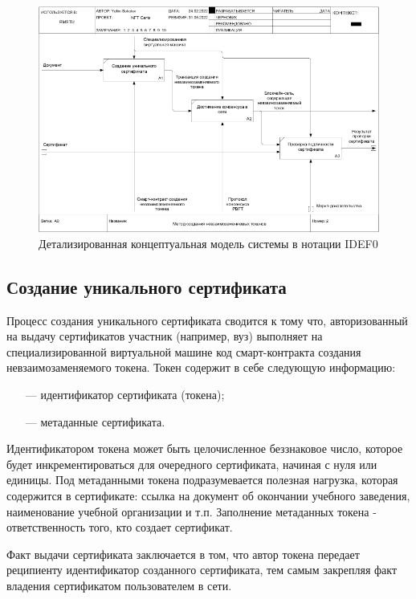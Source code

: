 \begin{figure}[!ht]
	\centering
	\includegraphics[width=\textwidth]{img/idef0_detail.png}
	\caption{Детализированная концептуальная модель системы в нотации IDEF0}
	\label{fig:a3}
\end{figure}

\subsection{Создание уникального сертификата}

Процесс создания уникального сертификата сводится к тому что, авторизованный на выдачу сертификатов участник (например, вуз) выполняет на специализированной виртуальной машине код смарт-контракта создания невзаимозаменяемого токена. Токен содержит в себе следующую информацию:
\begin{itemize}[leftmargin=1.6\parindent]
	\item[---] идентификатор сертификата (токена);
	\item[---] метаданные сертификата.
\end{itemize}
Идентификатором токена может быть целочисленное беззнаковое число, которое будет инкрементироваться для очередного сертификата, начиная с нуля или единицы. Под метаданными токена подразумевается полезная нагрузка, которая содержится в сертификате: ссылка на документ об окончании учебного заведения, наименование учебной организации и т.п. Заполнение метаданных токена - ответственность того, кто создает сертификат.

Факт выдачи сертификата заключается в том, что автор токена передает реципиенту идентификатор созданного сертификата, тем самым закрепляя факт владения сертификатом пользователем в сети.

